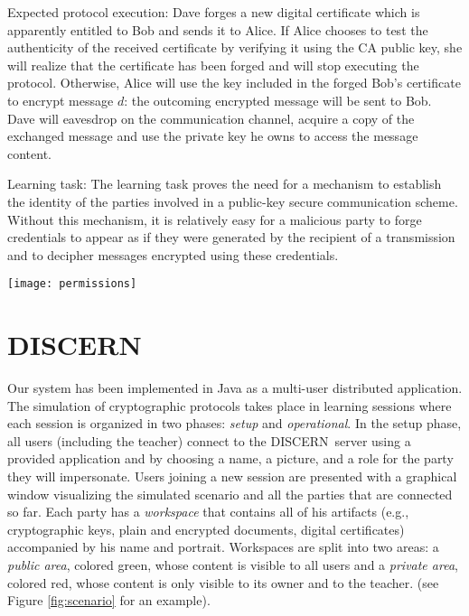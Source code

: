 \documentclass[10pt,conference]{IEEEtran}
\def\disgrace{DISCERN}
\begin{document}
{\sc Expected protocol execution:} Dave forges a new digital
certificate which is apparently entitled to Bob and sends it to
Alice. If Alice chooses to test the authenticity of the received
certificate by verifying it using the CA public key, she will realize
that the certificate has been forged and will stop executing the
protocol. Otherwise, Alice will use the key included in the forged
Bob's certificate to encrypt message $d$: the outcoming
encrypted message will be sent to Bob. Dave will eavesdrop on the
communication channel, acquire a copy of the exchanged message
and use the private key he owns to access the message content. 

{\sc Learning task:} The learning task proves the need
for a mechanism to establish the identity of the parties
involved in a public-key secure communication scheme.
Without this mechanism, it is relatively easy for
a malicious party to forge credentials to appear as if
they were generated by the recipient of a transmission
and to decipher messages encrypted using these credentials.

\begin{figure*}
\centering
\texttt{[image: permissions]}
\caption{The control panel the teacher uses to manage the interaction
  capabilities of all the other parties executing a protocol. In the
  setup phase the only active party is the teacher himself (i.e.,
  Rivest, in this case).}
\label{fig:permissions}
\end{figure*}


\section{DISCERN}
\label{sec:dgrace}
Our system has been implemented in Java as a multi-user distributed
application. The simulation of cryptographic protocols takes place in
learning sessions where each session is organized in two phases:
{\em setup} and {\em operational}. In the setup phase, all users
(including the teacher) connect to the \disgrace\ server using
a provided application and by choosing a name, a picture, and a
role for the party they will impersonate.  Users joining a new
session are presented with a graphical window visualizing
the simulated scenario and all the parties that are connected so far.
Each party has a {\em workspace} that contains all of his artifacts
(e.g., cryptographic keys, plain and encrypted documents, digital
certificates) accompanied by his name and portrait.
Workspaces are split into two areas: a {\em public area},
colored green, whose content is visible to all users and
a {\em private area}, colored red, whose content is only
visible to its owner and to the teacher. (see Figure \ref{fig:scenario} for an example).
\end{document}
